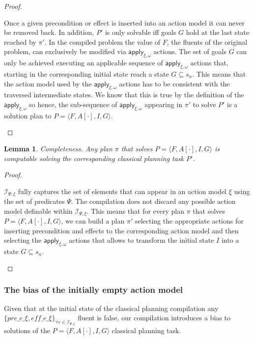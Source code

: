 \documentclass{article}
\newcommand{\tup}[1]{{\langle #1 \rangle}}
\newtheorem{mylemma}[mytheorem]{Lemma}
\begin{document}
\begin{proof}[Proof]
\begin{small}
Once a given precondition or effect is inserted into an action model it can never be removed back. In addition, $P'$ is only solvable iff goals $G$ hold at the last state reached by $\pi'$. In the compiled problem the value of $F$, the fluents of the original problem, can exclusively be modified via $\mathsf{apply_{\xi,\omega}}$ actions.  The set of goals $G$ can only be achieved executing an applicable sequence of $\mathsf{apply_{\xi,\omega}}$ actions that, starting in the corresponding initial state reach a state $G \subseteq s_n$. This means that the action model used by the $\mathsf{apply_{\xi,\omega}}$ actions has to be consistent with the traversed intermediate states.  We know that this is true by the definition of the $\mathsf{apply_{\xi,\omega}}$ so hence, the sub-sequence of $\mathsf{apply_{\xi,\omega}}$ appearing in $\pi'$ to solve $P'$ is a solution plan to $P=\tup{F,A[\cdot],I,G}$.
\end{small}
\end{proof}

\begin{mylemma}
Completeness. Any plan $\pi$ that solves $P=\tup{F,A[\cdot],I,G}$ is computable solving the corresponding classical planning task $P'$.
\end{mylemma}

\begin{proof}[Proof]
\begin{small}
 ${\mathcal I}_{\Psi,\xi}$ fully captures the set of elements that can appear in an action model $\xi$ using the set of predicates $\Psi$. The compilation does not discard any possible action model definable within ${\mathcal I}_{\Psi,\xi}$. This means that for every plan $\pi$ that solves $P=\tup{F,A[\cdot],I,G}$, we can build a plan $\pi'$ selecting the appropriate actions for inserting precondition and effects to the corresponding action model and then selecting the  $\mathsf{apply_{\xi,\omega}}$ actions that allows to transform the initial state $I$ into a state $G \subseteq s_n$.
\end{small}
\end{proof}

\subsubsection{The bias of the initially empty action model}
Given that at the initial state of the classical planning compilation any $\{pre\_e\_\xi, eff\_e\_\xi\}_{\forall e\in{\mathcal I}_{\Psi,\xi}}$ fluent is false, our compilation introduces a bias to solutions of the $P=\tup{F,A[\cdot],I,G}$ classical planning task.
\end{document}
